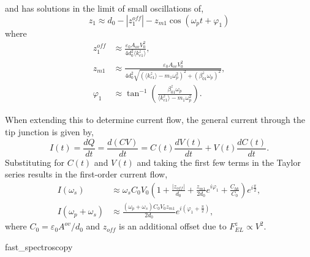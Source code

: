 \documentclass[12pt, a4paper, twoside]{book}
\begin{document}
and has solutions in the limit of small oscillations of,
\begin{equation}
z_1 \approx d_0 - \left|z_{1}^{off}\right| - z_{m1}\cos(\omega_pt+\varphi_1)
\label{eq:tip_oscillation_app}
\end{equation}
where
\begin{subequations}
\begin{align}
z_1^{off} &\approx %
\frac{ \varepsilon_0 A_{ov} V_0^2 }{ 4d_0^2 \langle k_{e1}^z \rangle }, \label{eq:tip_amp_app}\\
%
z_{m1} &\approx %
\frac{ \varepsilon_0 A_{ov} V_0^2 }%
{ 4d_0^2 \sqrt{ (\langle k_{e1}^z \rangle - m_1\omega_p^2)^2 + (\beta_{01}^z\omega_p)^2  } }, \\
%
\varphi_1 &\approx \tan^{-1}\left(\frac{\beta_{01}^{z}\omega_{p}}{\langle k_{e1}^{z} \rangle -m_{1}\omega_{p}^{2}}\right). \label{eq:tip_phase_app}
\end{align}
\end{subequations}

When extending this to determine current flow, the general current through the tip junction is given by,
\begin{equation}
I(t) = \frac{dQ}{dt} = \frac{d(CV)}{dt} = C(t)\frac{dV(t)}{dt} + V(t)\frac{dC(t)}{dt}.
\end{equation}
Substituting for $C(t)$ and $V(t)$ and taking the first few terms in the Taylor series results in the first-order current flow,
\begin{subequations}
\begin{align}
I(\omega_{s}) & \approx \omega_{s}C_{0}V_{0} \left(1+\frac{|z_{off}|}{d_{0}}+\frac{z_{m1}}{2d_{0}}e^{i\varphi_1}+\frac{C_{bk}}{C_{0}}\right)e^{i\frac{\pi}{2}},\\
%
I(\omega_{p}+\omega_{s}) & \approx \frac{\left(\omega_{p}+\omega_{s}\right)C_{0}V_{0}z_{m1}}{2d_{0}} e^{i\left(\varphi_1 + \frac{\pi}{2}\right)},
\label{eq:3rd_harmonic_current_app}
\end{align}
\end{subequations}
where $C_0 = \varepsilon_0 A^{ov} / d_0$ and $z_{off}$ is an additional offset due to $F_{EL}^z \propto V^2$.

{fast_spectroscopy}

\begin{singlespace}
\printbibliography[category=appendices, resetnumbers=true, title={Supplementary References}]
\end{singlespace}
\end{document}
